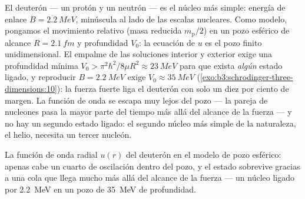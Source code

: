 \begin{example}\label{ex:b3:schrodinger-three-dimensions:deuteron}
El deuterón --- un protón y un neutrón --- es el núcleo más simple: energía
de enlace $B = \qty{2.2}{MeV}$, minúscula al lado de las escalas
nucleares. Como modelo, pongamos el movimiento relativo (masa reducida
$m_{\text{p}}/2$) en un pozo esférico de alcance $R = \qty{2.1}{fm}$ y
profundidad $V_0$: la ecuación de $u$ es el pozo finito unidimensional. El
empalme de las soluciones interior y exterior exige una profundidad mínima
$V_0 > \pi^2\hbar^2/8\mu R^2
\approx \qty{23}{MeV}$ para que exista \emph{algún} estado ligado, y
reproducir $B = \qty{2.2}{MeV}$ exige
$V_0 \approx \qty{35}{MeV}$
(\cref{exo:b3:schrodinger-three-dimensions:10}): la fuerza fuerte liga el
deuterón con solo un diez por ciento de margen. La función de onda se
escapa muy lejos del pozo --- la pareja de nucleones pasa la mayor parte del
tiempo más allá del alcance de la fuerza --- y no hay un segundo estado
ligado: el segundo núcleo más simple de la naturaleza, el helio, necesita un
tercer nucleón.
\end{example}

\begin{omfigure}

{\small La función de onda radial $u(r)$ del deuterón en el modelo de pozo
esférico: apenas cabe un cuarto de oscilación dentro del pozo, y el estado
sobrevive gracias a una cola que llega mucho más allá del alcance de la
fuerza --- un núcleo ligado por \qty{2.2}{MeV} en un pozo de
\qty{35}{MeV} de profundidad.}
\end{omfigure}


